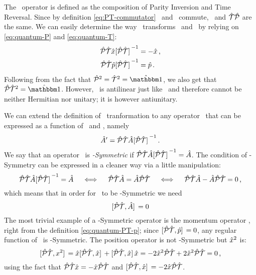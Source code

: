         The \hPT\ operator is defined as the composition of Parity Inversion and Time Reversal. Since by definition \eqref{eq:PT-commutator} \hP\ and \hT\ commute, \hPT\ and $\mathcal{\hat{T}}\mathcal{\hat{P}}$ are the same. We can easily determine the way \hPT\ transforms \hx\ and \hp\ by relying on \eqref{eq:quantum-P} and \eqref{eq:quantum-T}:
        \begin{align}
            \label{eq:quantum-PT-x}
            \PTtransform{\hx}
            &= -\hx
            \mycomma
            \\
            \label{eq:quantum-PT-p}
            \PTtransform{\hp}
            &= \hp
            \myperiod
        \end{align}
        Following from the fact that $\hP^2 = \hT^2 = \togglehat{\idM}$, we also get that $\hPT^2 = \togglehat{\idM}$. However, \hPT\ is antilinear just like \hT\ and therefore cannot be neither Hermitian nor unitary; it is however antiunitary.

        We can extend the definition of \PT\ tranformation to any operator \hA\ that can be expressed as a function of \hx\ and \hp, namely
        \begin{equation}
            \label{eq:pt-transform}
            \hA' = \PTtransform{\hA}
            \myperiod
        \end{equation}
        We say that an operator \hA\ is \emph{\PT-Symmetric} if $\PTtransform{\hA} = \hA$. The condition of \PT-Symmetry can be expressed in a cleaner way via a little manipulation:
        \begin{equation*}
            \PTtransform{\hA} = \hA
            \quad\iff\quad
            \hPT\hA = \hA\hPT
            \quad\iff\quad
            \hPT\hA - \hA\hPT = 0
            \mycomma
        \end{equation*}
        which means that in order for \hA\ to be \PT-Symmetric we need
        \begin{equation}
            \label{eq:pt-symmetric-operator}
            \comm*{\hPT}{\hA} = 0
        \end{equation}
        The most trivial example of a \PT-Symmetric operator is the momentum operator \hp, right from the definition \eqref{eq:quantum-PT-p}; since $\comm*{\hPT}{\hp} = 0$, any regular function of \hp\ is \PT-Symmetric. The position operator is not \PT-Symmetric but $\hat{x}^2$ is:
        \begin{equation*}
            \comm*{\hPT}{x^2}
            = \hx \comm*{\hPT}{\hx} + \comm*{\hPT}{\hx} \hx
            = -2\hx^2\hPT + 2\hx^2\hPT
            = 0
            \mycomma
        \end{equation*}
        using the fact that $\mathcal{\hat{P}}\mathcal{\hat{T}} \hat{x} = -\hat{x} \mathcal{\hat{P}}\mathcal{\hat{T}}$ and $\comm*{\hPT}{\hx} = -2\hx\hPT$.

